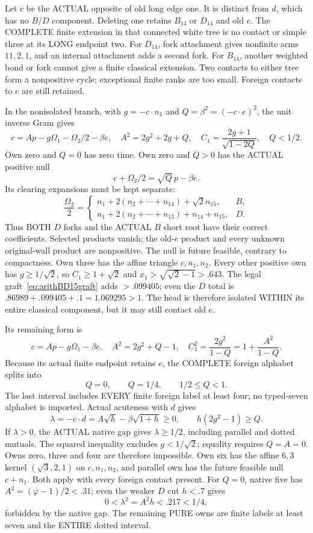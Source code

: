 \documentclass[11pt]{article}
\begin{document}
Let \(c\) be the ACTUAL opposite of old long edge one.
It is distinct from \(d\), which has no \(B/D\) component.
Deleting one retains \(B_{14}\) or \(D_{14}\) and old \(e\).
The COMPLETE finite extension in that connected white tree
is no contact or simple three at its LONG endpoint two.
For \(D_{14}\), fork attachment gives nonfinite arms
\(11,2,1\), and an internal attachment adds a second fork.
For \(B_{14}\), another weighted bond or fork cannot
give a finite classical extension.
Two contacts to either tree form a nonpositive cycle;
exceptional finite ranks are too small.
Foreign contacts to \(e\) are still retained.

In the nonisolated branch, with \(g=-c\cdot n_1\) and
\(Q=\beta^2=(-c\cdot e)^2\), the unit inverse Gram gives
\[
 c=Ap-g\Omega_1-\Omega_2/2-\beta e,\quad
 A^2=2g^2+2g+Q,\quad
 C_1={\frac{2g+1}{\sqrt{1-2Q}}},\quad Q<1/2 .
\]
Own zero and \(Q=0\) has zero time.
Own zero and \(Q>0\) has the ACTUAL positive null
\[
                         c+\Omega_2/2=\sqrt Q\,p-\beta e .
\]
Its clearing expansions must be kept separate:
\[
 {\frac{\Omega_2}{2}}=
 \begin{cases}
 n_1+2(n_2+\cdots+n_{14})+\sqrt2 n_{15},&B,\\
 n_1+2(n_2+\cdots+n_{13})+n_{14}+n_{15},&D .
 \end{cases}
\]
Thus BOTH \(D\) forks and the ACTUAL \(B\) short root
have their correct coefficients.
Selected products vanish; the old-\(e\) product and
every unknown original-wall product are nonpositive.
The null is future feasible, contrary to compactness.
Own three has the affine triangle \(c,n_1,n_2\).
Every other positive own has \(g\ge1/\sqrt2\), so
\(C_1\ge1+\sqrt2\) and
\(x_1>\sqrt{\sqrt2-1}>.643\).
The legal graft~\eqref{eq:arithBD15graft} adds \(>.099405\);
even the \(D\) total is
\(.86989+.099405+.1=1.069295>1\).
The head is therefore isolated WITHIN its entire
classical component, but it may still contact old \(e\).

Its remaining form is
\[
 c=Ap-g\Omega_1-\beta e,\quad
 A^2=2g^2+Q-1,\quad
 C_1^2={\frac{2g^2}{1-Q}}=1+{\frac{A^2}{1-Q}}.
\]
Because its actual finite endpoint retains \(e\),
the COMPLETE foreign alphabet splits into
\[
                   Q=0,\qquad Q=1/4,\qquad 1/2\le Q<1 .
\]
The last interval includes EVERY finite foreign label
at least four; no typed-seven alphabet is imported.
Actual acuteness with \(d\) gives
\[
 \lambda=-c\cdot d=A\sqrt h-\beta\sqrt{1+h}\ge0,
 \qquad h(2g^2-1)\ge Q .
\tag{R1N}\label{eq:arithBD15native}
\]
If \(\lambda>0\), the ACTUAL native gap gives
\(\lambda\ge1/2\), including parallel and dotted mutuals.
The squared inequality excludes \(g<1/\sqrt2\);
equality requires \(Q=A=0\).
Owns zero, three and four are therefore impossible.
Own six has the affine \(6,3\) kernel \((\sqrt3,2,1)\)
on \(c,n_1,n_2\), and parallel own has the future
feasible null \(c+n_1\).
Both apply with every foreign contact present.
For \(Q=0\), native five has
\(A^2=(\varphi-1)/2<.31\); even the weaker \(D\)
cut \(h<.7\) gives
\[
                         0<\lambda^2=A^2h<.217<1/4 ,
\]
forbidden by the native gap.
The remaining PURE owns are finite labels at least
seven and the ENTIRE dotted interval.
\end{document}
